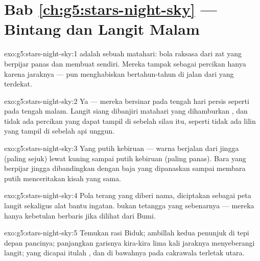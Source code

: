 \section*{Bab \ref{ch:g5:stars-night-sky} --- Bintang dan Langit Malam}

\begin{solution}{exo:g5:stars-night-sky:1}
 adalah sebuah matahari: bola raksasa dari zat yang berpijar
panas dan membuat  sendiri. Mereka tampak sebagai percikan
hanya karena jaraknya ---  pun menghabiskan bertahun-tahun di
jalan dari yang terdekat.
\end{solution}

\begin{solution}{exo:g5:stars-night-sky:2}
Ya --- mereka bersinar pada tengah hari persis seperti pada tengah
malam. Langit siang dibanjiri  matahari yang dihamburkan ,
dan tidak ada percikan yang dapat tampil di sebelah silau itu, seperti
tidak ada lilin yang tampil di sebelah api unggun.
\end{solution}

\begin{solution}{exo:g5:stars-night-sky:3}
Yang putih kebiruan --- warna  berjalan dari jingga (paling
sejuk) lewat kuning sampai putih kebiruan (paling panas). Bara yang
berpijar jingga dibandingkan dengan baja yang dipanaskan sampai
membara putih menceritakan kisah yang sama.
\end{solution}

\begin{solution}{exo:g5:stars-night-sky:4}
Pola  terang yang diberi nama, diciptakan sebagai peta langit
sekaligus alat bantu ingatan.  bukan tetangga yang
sebenarnya --- mereka hanya kebetulan berbaris jika dilihat dari Bumi.
\end{solution}

\begin{solution}{exo:g5:stars-night-sky:5}
Temukan rasi Biduk; ambillah kedua  penunjuk di tepi depan
pancinya; panjangkan garisnya kira-kira lima kali jaraknya menyeberangi
langit;  yang dicapai itulah , dan di bawahnya
pada cakrawala terletak utara.
\end{solution}

